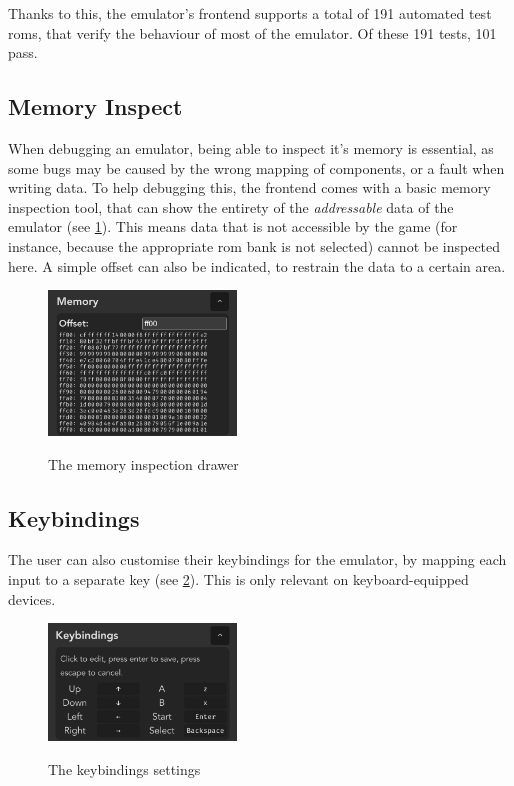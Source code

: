 \documentclass[11pt]{report}
\begin{document}
Thanks to this, the emulator's frontend supports a total of 191 automated test \glspl{rom}, that verify the behaviour of most of the emulator. Of these 191 tests, 101 pass.

\subsection{Memory Inspect}

When debugging an emulator, being able to inspect it's memory is essential, as some bugs may be caused by the wrong mapping of components, or a fault when writing data. To help debugging this, the frontend comes with a basic memory inspection tool, that can show the entirety of the \textit{addressable} data of the emulator (see \ref{fig:memory-inspect}). This means data that is not accessible by the game (for instance, because the appropriate \gls{rom} bank is not selected) cannot be inspected here. A simple offset can also be indicated, to restrain the data to a certain area.

\begin{figure}[h]
    \centering
    \includegraphics[width=5cm]{images/memory-inspect}\\
    \caption{The memory inspection drawer}
    \label{fig:memory-inspect}
\end{figure}

\subsection{Keybindings}

The user can also customise their keybindings for the emulator, by mapping each input to a separate key (see \ref{fig:keybindings}). This is only relevant on keyboard-equipped devices.

\begin{figure}[h]
    \centering
    \includegraphics[width=5cm]{images/keybindings}\\
    \caption{The keybindings settings}
    \label{fig:keybindings}
\end{figure}
\end{document}

